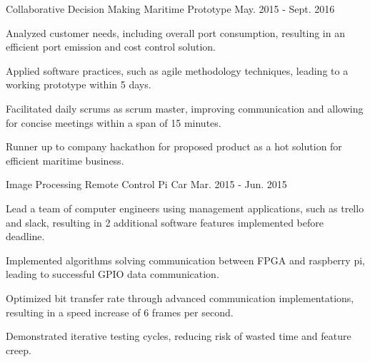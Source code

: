 

\begin{cventries}

  \cvtechentry
    {Collaborative Decision Making Maritime Prototype} %
    {} %
    {} %
    {May. 2015 - Sept. 2016} %
    {
      \begin{cvitems} %
        \item {Analyzed customer needs, including overall port consumption, resulting in an efficient port emission and cost control solution.}
        \item {Applied software practices, such as agile methodology techniques, leading to a working prototype within 5 days.}
        \item {Facilitated daily scrums as scrum master, improving communication and allowing for concise meetings within a span of 15 minutes.}
        \item {Runner up to company hackathon for proposed product as a hot solution for efficient maritime business.}
      \end{cvitems}
    }
    
  \cvtechentry
    {Image Processing Remote Control Pi Car} %
    {} %
    {} %
    {Mar. 2015 - Jun. 2015} %
    {
      \begin{cvitems} %
        \item {Lead a team of computer engineers using management applications, such as trello and slack, resulting in 2 additional software features implemented before deadline.}
        \item {Implemented algorithms solving communication between FPGA and raspberry pi, leading to successful GPIO data communication.}
        \item {Optimized bit transfer rate through advanced communication implementations, resulting in a speed increase of 6 frames per second.}
        \item {Demonstrated iterative testing cycles, reducing risk of wasted time and feature creep.}
      \end{cvitems}
    }
    

\end{cventries}
